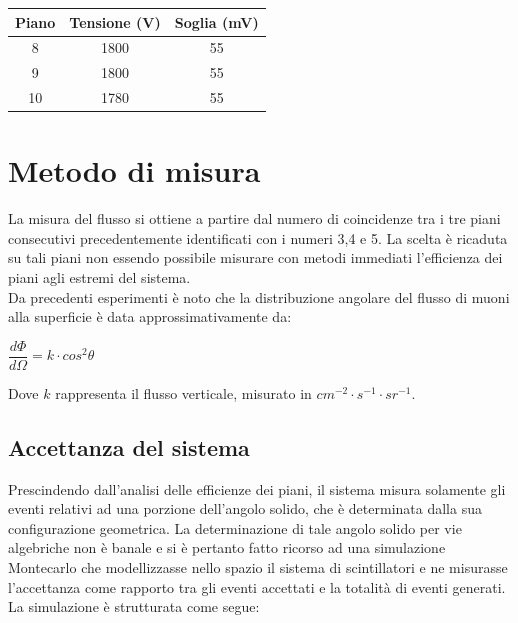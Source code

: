 \documentclass[11pt]{article}
\begin{document}
\begin{flushleft}
\begin{center}
\begin{tabular}{|c|c|c|}
\hline 
\textbf{Piano} & \textbf{Tensione (V)} & \textbf{Soglia (mV)} \\ 
\hline 
8 & 1800 & 55 \\ 
\hline 
9 & 1800 & 55 \\ 
\hline 
10 & 1780 & 55 \\ 
\hline 
\end{tabular} 

\end{center}

\section{Metodo di misura}
La misura del flusso si ottiene a partire dal numero di coincidenze tra i tre piani consecutivi precedentemente identificati con i numeri 3,4 e 5. La scelta è ricaduta su tali piani non essendo possibile misurare con metodi immediati l'efficienza dei piani agli estremi del sistema.\\
Da precedenti esperimenti \cite{PDG_cosquadro} è noto che la distribuzione angolare del flusso di muoni alla superficie è data approssimativamente da:\\

\begin{center}
$\dfrac{d\Phi}{d\Omega}=k\cdot cos^2 \theta$\\
\end{center}

Dove $k$ rappresenta il flusso verticale, misurato in $cm^{-2} \cdot s^{-1} \cdot sr^{-1}$.\\



\subsection{Accettanza del sistema} \label{subsec:MC}
Prescindendo dall'analisi delle efficienze dei piani, il sistema misura solamente gli eventi relativi ad una porzione dell'angolo solido, che è determinata dalla sua configurazione geometrica. La determinazione di tale angolo solido per vie algebriche non è banale e si è pertanto fatto ricorso ad una simulazione Montecarlo che modellizzasse nello spazio il sistema di scintillatori e ne misurasse l'accettanza  come rapporto tra gli eventi accettati e la totalità di eventi generati. La simulazione è strutturata come segue:


\end{flushleft}
\end{document}
